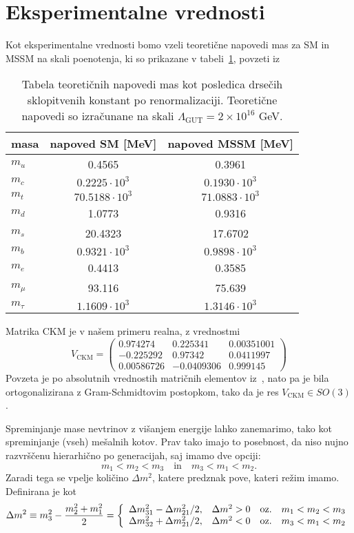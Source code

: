 \section{Eksperimentalne vrednosti}
Kot eksperimentalne vrednosti bomo vzeli teoretične napovedi mas za SM in MSSM na skali poenotenja,
ki so prikazane v tabeli~\ref{eksp}, povzeti iz~\cite{mass:eksp}
\begin{table}[H]\centering
	\caption{Tabela teoretičnih napovedi mas kot posledica drsečih sklopitvenih konstant po
		renormalizaciji. Teoretične napovedi so izračunane na skali
		$\Lambda_\text{GUT} = 2\times 10^{16}$ GeV.}
	\begin{tabular}{l|c|c}
		masa & napoved SM [MeV] & napoved MSSM [MeV] \\
		\hline\hline
		$m_u$ & 0.4565 & 0.3961 \\
		$m_c$ & $0.2225 \cdot 10^3$ & $0.1930 \cdot 10^3$ \\
		$m_t$ & $70.5188 \cdot 10^3$ & $71.0883 \cdot 10^3$ \\
		\hline
		$m_d$ & 1.0773 & 0.9316 \\
		$m_s$ & 20.4323 & 17.6702 \\
		$m_b$ & $0.9321 \cdot 10^3$ & $0.9898 \cdot 10^3$ \\
		\hline
		$m_e$ & 0.4413 & 0.3585 \\
		$m_\mu$ & 93.116 & 75.639 \\
		$m_\tau$ & $1.1609 \cdot 10^3$ & $1.3146 \cdot 10^3$
	\end{tabular}
	\label{eksp}
\end{table}
\noindent Matrika CKM je v našem primeru realna, z vrednostmi
\begin{equation}
	V_\text{CKM} = \begin{pmatrix}
		0.974274 & 0.225341 & 0.00351001 \\
		-0.225292 & 0.97342 & 0.0411997 \\
		0.00586726 & -0.0409306 & 0.999145
	\end{pmatrix}
\end{equation}
Povzeta je po absolutnih vrednostih matričnih elementov iz~\cite{pdg:ckm}, nato pa je bila
ortogonalizirana z Gram-Schmidtovim postopkom, tako da je res $V_\text{CKM} \in SO(3)$.

Spreminjanje mase nevtrinov z višanjem energije lahko zanemarimo, tako kot spreminjanje (vseh) 
mešalnih kotov. Prav tako imajo to posebnost, da niso nujno razvrščenu hierarhično po generacijah,
saj imamo dve opciji:
\begin{equation}
	m_1 < m_2 < m_3\quad \text{in} \quad m_3 < m_1 < m_2.
\end{equation}
Zaradi tega se vpelje količino $\Delta m^2$, katere predznak pove, kateri režim imamo. Definirana
je kot
\begin{equation}
	\Delta m^2 \equiv m_3^2 - \frac{m_2^2 + m_1^2}{2} = \left\{\begin{array}{c c c c}
		\Delta m^2_{31} - \Delta m^2_{21}/2, & \Delta m^2 > 0 & \text{oz.} & m_1 < m_2 < m_3  \\
		\Delta m^2_{32} + \Delta m^2_{21}/2, & \Delta m^2 < 0 & \text{oz.} & m_3 < m_1 < m_2
	\end{array}\right.
\end{equation}

